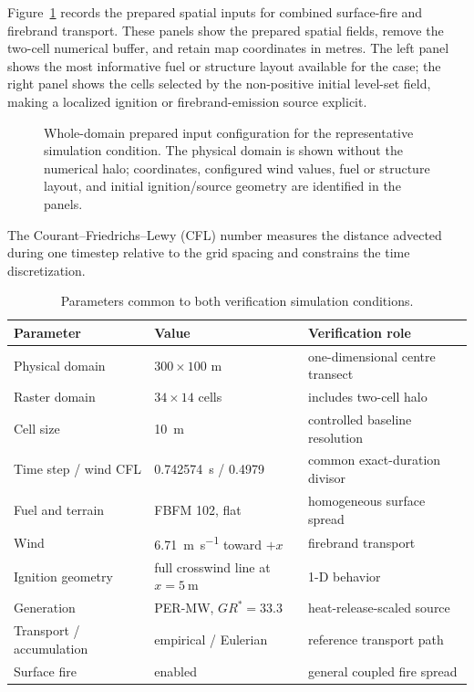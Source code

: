 Figure~\ref{fig:input-configuration} records the prepared spatial inputs for combined surface-fire and firebrand transport.
These panels show the prepared spatial fields, remove the
two-cell numerical buffer, and retain map coordinates in metres.  The left panel shows
the most informative fuel or structure layout available for the case; the right panel
shows the cells selected by the non-positive initial level-set field, making a localized
ignition or firebrand-emission source explicit.

\begin{figure}[H]
\centering
{}
\caption{Whole-domain prepared input configuration for the representative simulation condition.  The
physical domain is shown without the numerical halo; coordinates, configured wind values,
fuel or structure layout, and initial ignition/source geometry are identified in the panels.}
\label{fig:input-configuration}
\end{figure}

The Courant--Friedrichs--Lewy (CFL) number measures the distance
advected during one timestep relative to the grid spacing and
constrains the time discretization.

\begin{table}[htbp]
\centering
\caption{Parameters common to both verification simulation conditions.}
\label{tab:common-config}
\begin{tabular}{lll}
\toprule
Parameter & Value & Verification role \\
\midrule
Physical domain & $300\times100$ m & one-dimensional centre transect \\
Raster domain & $34\times14$ cells & includes two-cell halo \\
Cell size & \SI{10}{\metre} & controlled baseline resolution \\
Time step / wind CFL & \SI{0.742574}{\second} / 0.4979 & common exact-duration divisor \\
Fuel and terrain & FBFM 102, flat & homogeneous surface spread \\
Wind & \SI{6.71}{\metre\per\second} toward $+x$ & firebrand transport \\
Ignition geometry & full crosswind line at $x=\SI{5}{\metre}$ & 1-D behavior \\
Generation & PER-MW, $GR^*=33.3$ & heat-release-scaled source \\
Transport / accumulation & empirical / Eulerian & reference transport path \\
Surface fire & enabled & general coupled fire spread \\
\bottomrule
\end{tabular}
\end{table}

